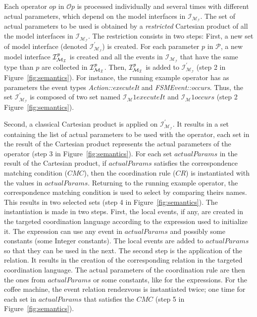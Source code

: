 Each operator $op$ in $\mathcal{O}p$ is processed individually and several times with different actual parameters, which depend on the model interfaces in $\mathcal{I_{M_I}}$. The set of actual parameters to be used is obtained by a \emph{restricted} Cartesian product of all the model interfaces in $\mathcal{I_{M_I}}$. The restriction consists in two steps: First, a new set of model interface (denoted $\mathcal{I^{'}_{M_I}}$) is created. For each parameter $p$ in $\mathcal{P}$, a new model interface $\mathcal{I^{\textit{\text{p}}}_{M_I}}$ is created and all the events in $\mathcal{I_{M_I}}$ that have the same type than $p$ are collected in $\mathcal{I^{\textit{\text{p}}}_{M_I}}$. Then, $\mathcal{I^{\textit{\text{p}}}_{M_I}}$ is added to $\mathcal{I^{'}_{M_I}}$ (step 2 in Figure~\ref{fig:semantics}). For instance, the running example operator has as parameters the event types \emph{Action::executeIt} and \emph{FSMEvent::occurs}. Thus, the set $\mathcal{I^{'}_{M_I}}$ is composed of two set named $\mathcal{I_M}{1}{executeIt}$ and $\mathcal{I_M}{1}{occurs}$ (step 2 Figure~\ref{fig:semantics}).
%

Second, a classical Cartesian product is applied on $\mathcal{I^{'}_{M_I}}$. It results in a set containing the list of actual parameters to be used with the operator, \ie each set in the result of the Cartesian product represents the actual parameters of the operator (step 3 in Figure~\ref{fig:semantics}). For each set $actualParams$ in the result of the Cartesian product, if $actualParams$ satisfies the correspondence matching condition ($CMC$), then the coordination rule ($CR$) is instantiated with the values in $actualParams$. Returning to the running example operator, the correspondence matching condition is used to select \mse by comparing theirs names. This results in two selected sets (step 4 in Figure~\ref{fig:semantics}). The instantiation is made in two steps. First, the local events, if any, are created in the targeted coordination language according to the expression used to initialize it. The expression can use any event in $actualParams$ and possibly some constants (\eg some Integer constants). The local events are added to $actualParams$ so that they can be used in the next. The second step is the application of the relation. It results in the creation of the corresponding relation in the targeted coordination language. The actual parameters of the coordination rule are then the ones from $actualParams$ or some constants, like for the expressions. For the coffee machine, the event relation rendezvous is instantiated twice; one time for each set in $actualParams$ that satisfies the $CMC$ (step 5 in Figure~\ref{fig:semantics}).

